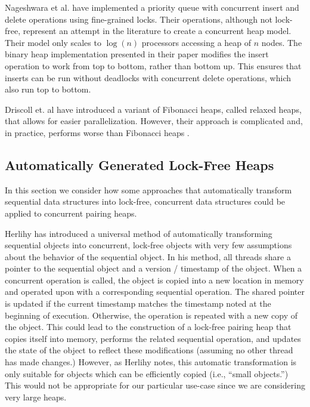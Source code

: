 \documentclass{acm_proc_article-sp}
\begin{document}
Nageshwara et al. \cite{nageshwara88} have implemented a priority queue with concurrent insert and delete operations using fine-grained locks. Their operations, although not lock-free, represent an attempt in the literature to create a concurrent heap model. Their model only scales to $\log(n)$ processors accessing a heap of $n$ nodes. The binary heap implementation presented in their paper modifies the insert operation to work from top to bottom, rather than bottom up. This ensures that inserts can be run without deadlocks with concurrent delete operations, which also run top to bottom.

Driscoll et. al \cite{driscoll88} have introduced a variant of Fibonacci heaps, called
relaxed heaps, that allows for easier parallelization. However, their approach
is complicated \cite{elmasry10} and, in practice, performs worse than Fibonacci heaps \cite{moret94}.  

\subsection{Automatically Generated Lock-Free Heaps}

In this section we consider how some approaches that automatically
transform sequential data structures into lock-free, concurrent data
structures could be applied to concurrent pairing heaps.

Herlihy \cite{herlihy93} has introduced a universal method of automatically
transforming sequential objects
into concurrent, lock-free objects with very few assumptions about the behavior
of the sequential object. In his method, all threads share a pointer to
the sequential object and a version / timestamp of the object.
When a concurrent operation is called, the object is copied into
a new location in memory and operated upon with a corresponding sequential operation.
The shared pointer is updated if the current timestamp matches the timestamp noted at the beginning
of execution. Otherwise,
the operation is repeated with a new copy of the object. This could lead to the construction
of a lock-free pairing heap that copies itself into memory, performs the related sequential
operation, and updates the state of the object to reflect these modifications (assuming no
other thread has made changes.) However, as Herlihy notes, this automatic transformation
is only suitable for objects which can be efficiently copied (i.e., ``small objects.'')
This would not be appropriate for our particular use-case since we are considering
very large heaps.
\end{document}
